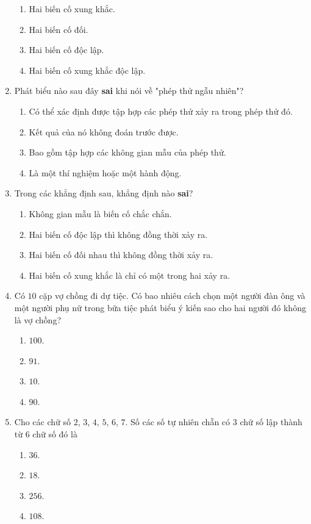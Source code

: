 \begin{enumerate}[label=\textbf{Câu \arabic*.},align=left,left=0cm..0cm,itemindent=*]
\begin{enumerate}[label=\textbf{\Alph*.},align=left,left=1cm..0cm,itemindent=*]
		\item Hai biến cố xung khắc.
		\item Hai biến cố đối.
		\item Hai biến cố độc lập.
		\item Hai biến cố xung khắc độc lập.
	\end{enumerate}
	\item Phát biểu nào sau đây \textbf{sai} khi nói về "phép thử ngẫu nhiên"?
	\begin{enumerate}[label=\textbf{\Alph*.},align=left,left=1cm..0cm,itemindent=*]
		\item Có thể xác định được tập hợp các phép thử xảy ra trong phép thử đó.
		\item Kết quả của nó không đoán trước được.
		\item Bao gồm tập hợp các không gian mẫu của phép thử.
		\item Là một thí nghiệm hoặc một hành động.
	\end{enumerate}
	\item Trong các khẳng định sau, khẳng định nào \textbf{sai}?
	\begin{enumerate}[label=\textbf{\Alph*.},align=left,left=1cm..0cm,itemindent=*]
		\item Không gian mẫu là biến cố chắc chắn.
		\item Hai biến cố độc lập thì không đồng thời xảy ra.
		\item Hai biến cố đối nhau thì không đồng thời xảy ra.
		\item Hai biến cố xung khắc là chỉ có một trong hai xảy ra.
	\end{enumerate}
	\item Có $10$ cặp vợ chồng đi dự tiệc. Có bao nhiêu cách chọn một người đàn ông và một người phụ nữ trong bữa tiệc phát biểu ý kiến sao cho hai người đó không là vợ chồng?
	\begin{enumerate}[label=\textbf{\Alph*.},align=left,left=1cm..0cm,itemindent=*]
		\item $100$. \item $91$. \item $10$. \item $90$.
	\end{enumerate}
	\item Cho các chữ số $2$, $3$, $4$, $5$, $6$, $7$. Số các số tự nhiên chẵn có 3 chữ số lập thành từ 6 chữ số đó là
	\begin{enumerate}[label=\textbf{\Alph*.},align=left,left=1cm..0cm,itemindent=*]
		\item $36$. \item $18$. \item $256$. \item $108$.

\end{enumerate}
\end{enumerate}
